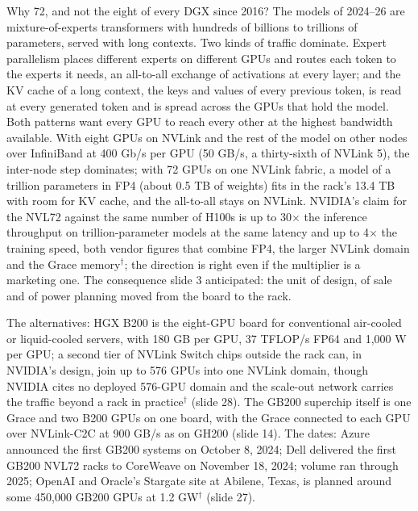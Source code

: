 \documentclass[11pt,letterpaper]{article}
\begin{document}
Why 72, and not the eight of every DGX since 2016? The models of 2024--26 are mixture-of-experts transformers with hundreds of billions to trillions of parameters, served with long contexts. Two kinds of traffic dominate. Expert parallelism places different experts on different GPUs and routes each token to the experts it needs, an all-to-all exchange of activations at every layer; and the KV cache of a long context, the keys and values of every previous token, is read at every generated token and is spread across the GPUs that hold the model. Both patterns want every GPU to reach every other at the highest bandwidth available. With eight GPUs on NVLink and the rest of the model on other nodes over InfiniBand at 400 Gb/s per GPU (50 GB/s, a thirty-sixth of NVLink 5), the inter-node step dominates; with 72 GPUs on one NVLink fabric, a model of a trillion parameters in FP4 (about 0.5 TB of weights) fits in the rack's 13.4 TB with room for KV cache, and the all-to-all stays on NVLink. NVIDIA's claim for the NVL72 against the same number of H100s is up to 30$\times$ the inference throughput on trillion-parameter models at the same latency and up to 4$\times$ the training speed, both vendor figures that combine FP4, the larger NVLink domain and the Grace memory$^\dagger$; the direction is right even if the multiplier is a marketing one. The consequence slide 3 anticipated: the unit of design, of sale and of power planning moved from the board to the rack.

The alternatives: HGX B200 is the eight-GPU board for conventional air-cooled or liquid-cooled servers, with 180 GB per GPU, 37 TFLOP/s FP64 and 1{,}000 W per GPU; a second tier of NVLink Switch chips outside the rack can, in NVIDIA's design, join up to 576 GPUs into one NVLink domain, though NVIDIA cites no deployed 576-GPU domain and the scale-out network carries the traffic beyond a rack in practice$^\dagger$ (slide 28). The GB200 superchip itself is one Grace and two B200 GPUs on one board, with the Grace connected to each GPU over NVLink-C2C at 900 GB/s as on GH200 (slide 14). The dates: Azure announced the first GB200 systems on October 8, 2024; Dell delivered the first GB200 NVL72 racks to CoreWeave on November 18, 2024; volume ran through 2025; OpenAI and Oracle's Stargate site at Abilene, Texas, is planned around some 450{,}000 GB200 GPUs at 1.2 GW$^\dagger$ (slide 27).
\end{document}
